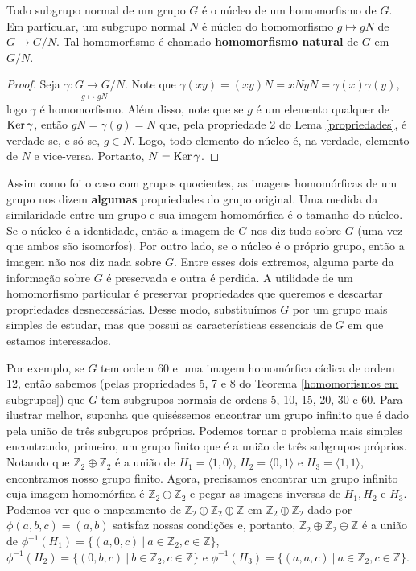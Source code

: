 	\begin{theorem}
		\label{subgrupos normais e nucleos}
		Todo subgrupo normal de um grupo $G$ é o núcleo de um homomorfismo de $G$. Em particular, um subgrupo normal $N$ é núcleo do homomorfismo $g\mapsto gN$ de $G\to G/N$. Tal homomorfismo é chamado \textbf{homomorfismo natural} de $G$ em $G/N$.
	\end{theorem}
	\begin{proof}
		Seja $\displaystyle{ \underset{g\mapsto gN}{\gamma : G\to G/N }}$. Note que 
		$\gamma(xy) = (xy)N = xNyN = \gamma(x)\gamma(y)$, logo $\gamma$ é homomorfismo. 
		Além disso, note que se $g$ é um elemento qualquer de $\operatorname{Ker}\gamma$, então $gN = \gamma(g) = N$ que, 
		pela propriedade 2 do Lema \ref{propriedades}, é verdade se, e só se, $g\in N$. Logo, 
		todo elemento do núcleo é, na verdade, elemento de $N$ e vice-versa. Portanto, $N = \operatorname{Ker}\gamma$.
	\end{proof}
	Assim como foi o caso com grupos quocientes, as imagens homomórficas de um grupo 
	nos dizem \textbf{algumas} propriedades do grupo original. Uma medida da similaridade entre um grupo 
	e sua imagem homomórfica é o tamanho do núcleo. Se o núcleo é a identidade, então a imagem de $G$ 
	nos diz tudo sobre $G$ (uma vez que ambos são isomorfos). Por outro lado, se o núcleo é o próprio grupo, 
	então a imagem não nos diz nada sobre $G$. Entre esses dois extremos, alguma parte da informação sobre 
	$G$ é preservada e outra é perdida. A utilidade de um homomorfismo particular é preservar propriedades 
	que queremos e descartar propriedades desnecessárias. Desse modo, substituímos $G$ por um grupo mais 
	simples de estudar, mas que possui as características essenciais de $G$ em que estamos interessados.
	\begin{example}
	Por exemplo, se $G$ tem ordem 60 e uma imagem homomórfica cíclica de ordem 12, então
	sabemos (pelas propriedades 5, 7 e 8 do Teorema \ref{homomorfismos em subgrupos}) que $G$ tem subgrupos
	normais de ordens 5, 10, 15, 20, 30 e 60. Para ilustrar melhor, suponha que quiséssemos encontrar um grupo
	infinito que é dado pela união de três subgrupos próprios. Podemos tornar o problema mais simples encontrando,
	primeiro, um grupo finito que é a união de três subgrupos próprios. Notando que
	$\mathbb{Z}_2\oplus\mathbb{Z}_2$ é a união de $H_1 = \langle 1,0 \rangle$, $H_2 = \langle 0,1 \rangle$ e 
	$H_3 = \langle 1,1 \rangle$, encontramos nosso grupo finito. Agora, precisamos encontrar um grupo infinito
	cuja imagem homomórfica é $\mathbb{Z}_2\oplus\mathbb{Z}_2$ e pegar as imagens inversas de $H_1, H_2$ e $H_3$.
	Podemos ver que o mapeamento de $\mathbb{Z}_2\oplus\mathbb{Z}_2\oplus\mathbb{Z}$ em
	$\mathbb{Z}_2\oplus\mathbb{Z}_2$ dado por $\phi(a,b,c) = (a,b)$ satisfaz nossas condições e, portanto,
	$\mathbb{Z}_2\oplus\mathbb{Z}_2\oplus\mathbb{Z}$ é a união de 
	$\phi^{-1}(H_1) = \{ (a,0,c) \ | \ a\in\mathbb{Z}_2, c\in\mathbb{Z} \}$, $\phi^{-1}(H_2) 
	= \{ (0,b,c) \ | \ b\in\mathbb{Z}_2, c\in\mathbb{Z} \}$ e 
	$\phi^{-1}(H_3) = \{ (a,a,c) \ | \ a\in\mathbb{Z}_2, c\in\mathbb{Z} \}$.
	\end{example}
